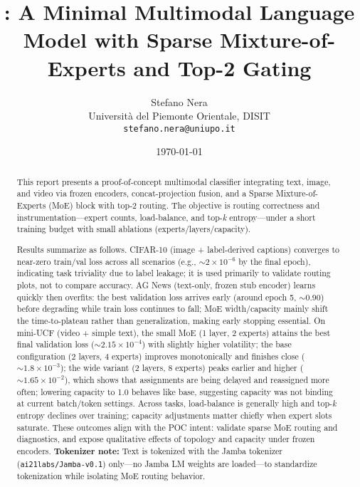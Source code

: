 \documentclass[11pt,a4paper]{article}
\title{\ProjectName: A Minimal Multimodal Language Model with Sparse Mixture-of-Experts and Top-2 Gating}
\author{Stefano Nera \\ Università del Piemonte Orientale, DISIT \\ \texttt{stefano.nera@uniupo.it}}
\date{\today}
\begin{document}
\maketitle

\begin{abstract}
This report presents a proof-of-concept multimodal classifier integrating text, image, and video via frozen encoders, concat-projection fusion, and a Sparse Mixture-of-Experts (MoE) block with top-2 routing. The objective is routing correctness and instrumentation—expert counts, load-balance, and top-\textit{k} entropy—under a short training budget with small ablations (experts/layers/capacity).

Results summarize as follows. CIFAR-10 (image + label-derived captions) converges to near-zero train/val loss across all scenarios (e.g., ${\sim}2\times10^{-6}$ by the final epoch), indicating task triviality due to label leakage; it is used primarily to validate routing plots, not to compare accuracy. AG News (text-only, frozen stub encoder) learns quickly then overfits: the best validation loss arrives early (around epoch 5, ${\sim}0.90$) before degrading while train loss continues to fall; MoE width/capacity mainly shift the time-to-plateau rather than generalization, making early stopping essential. On mini-UCF (video + simple text), the small MoE (1 layer, 2 experts) attains the best final validation loss (${\sim}2.15\times10^{-4}$) with slightly higher volatility; the base configuration (2 layers, 4 experts) improves monotonically and finishes close (${\sim}1.8\times10^{-3}$); the wide variant (2 layers, 8 experts) peaks earlier and higher (${\sim}1.65\times10^{-2}$), which shows that assignments are being delayed and reassigned more often; lowering capacity to 1.0 behaves like base, suggesting capacity was not binding at current batch/token settings. Across tasks, load-balance is generally high and top-\textit{k} entropy declines over training; capacity adjustments matter chiefly when expert slots saturate. These outcomes align with the POC intent: validate sparse MoE routing and diagnostics, and expose qualitative effects of topology and capacity under frozen encoders.
\textbf{Tokenizer note:} Text is tokenized with the Jamba tokenizer (\texttt{ai21labs/Jamba-v0.1})\cite{jamba2024} only—no Jamba LM weights are loaded—to standardize tokenization while isolating MoE routing behavior.
\end{abstract}
\end{document}
